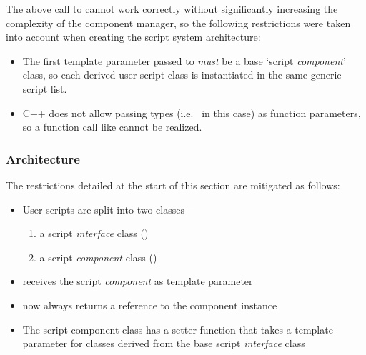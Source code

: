 \documentclass{projdoc}
\begin{document}
The above call to  cannot work correctly
without significantly increasing the complexity of the component manager, so the
following restrictions were taken into account when creating the script system
architecture:\noparbreak

\begin{itemize}
	\item The first template parameter passed to 
		\emph{must} be a base `script \emph{component}' class, so each derived user
		script class is instantiated in the same generic script list.
	\item C++ does not allow passing types (i.e.~ in this case) as
		function parameters, so a function call like
		 cannot be realized.
\end{itemize}

\subsubsection{Architecture}
\label{sec:scripts:architecture}

The restrictions detailed at the start of this section are mitigated as
follows:\noparbreak

\begin{itemize}
	\item User scripts are split into two classes---
		\begin{enumerate}
			\item a script \emph{interface} class ()
			\item a script \emph{component} class ()
		\end{enumerate}
	\item {} receives the script \emph{component}
		as template parameter
	\item {} now always returns a reference to the
		component instance
	\item The script component class has a setter function that takes a template
		parameter for classes derived from the base script \emph{interface} class
\end{itemize}
\end{document}

